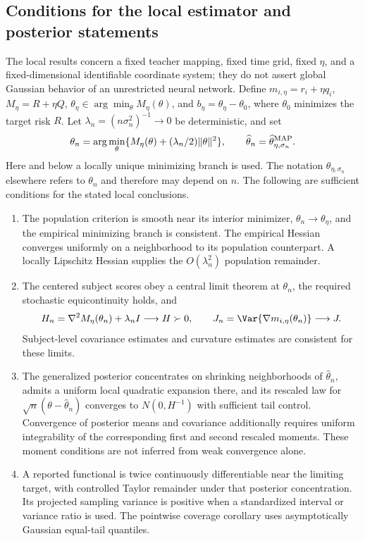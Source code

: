 \documentclass{article} %
\begin{document}
\subsection{Conditions for the local estimator and posterior statements}
\label{app:local-regularity}

The local results concern a fixed teacher mapping, fixed time grid, fixed $\eta$, and a fixed-dimensional identifiable coordinate system; they do not assert global Gaussian behavior of an unrestricted neural network. Define $m_{i,\eta}=r_i+\eta q_i$, $M_\eta=R+\eta Q$, $\theta_\eta\in\arg\min_\theta M_\eta(\theta)$, and $b_\eta=\theta_\eta-\theta_0$, where $\theta_0$ minimizes the target risk $R$. Let $\lambda_n=(n\sigma_n^2)^{-1}\to0$ be deterministic, and set
\[
\theta_n=\arg\min_\theta\{M_\eta(\theta)+(\lambda_n/2)\|\theta\|^2\},
\qquad
\widehat\theta_n=\widehat\theta_{\eta,\sigma_n}^{\rm MAP}.
\]
Here and below a locally unique minimizing branch is used. The notation $\theta_{\eta,\sigma_n}$ elsewhere refers to $\theta_n$ and therefore may depend on $n$. The following are sufficient conditions for the stated local conclusions.
\begin{enumerate}
\item The population criterion is smooth near its interior minimizer, $\theta_n\to\theta_\eta$, and the empirical minimizing branch is consistent. The empirical Hessian converges uniformly on a neighborhood to its population counterpart. A locally Lipschitz Hessian supplies the $O(\lambda_n^2)$ population remainder.
\item The centered subject scores obey a central limit theorem at $\theta_n$, the required stochastic equicontinuity holds, and
\begin{equation}
H_n=\nabla^2M_\eta(\theta_n)+\lambda_nI\longrightarrow H\succ0,
\qquad
J_n=\Var\{\nabla m_{i,\eta}(\theta_n)\}\longrightarrow J.
\label{eq:fixed-pair-HJ}
\end{equation}
Subject-level covariance estimates and curvature estimates are consistent for these limits.
\item The generalized posterior concentrates on shrinking neighborhoods of $\widehat\theta_n$, admits a uniform local quadratic expansion there, and its rescaled law for $\sqrt n(\theta-\widehat\theta_n)$ converges to $N(0,H^{-1})$ with sufficient tail control. Convergence of posterior means and covariance additionally requires uniform integrability of the corresponding first and second rescaled moments. These moment conditions are not inferred from weak convergence alone.
\item A reported functional is twice continuously differentiable near the limiting target, with controlled Taylor remainder under that posterior concentration. Its projected sampling variance is positive when a standardized interval or variance ratio is used. The pointwise coverage corollary uses asymptotically Gaussian equal-tail quantiles.
\end{enumerate}
\end{document}
